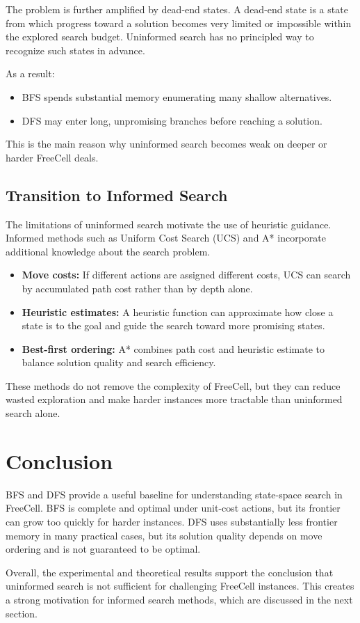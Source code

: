\documentclass{article}
\begin{document}
The problem is further amplified by dead-end states. A dead-end state is a state from which progress toward a solution becomes very limited or impossible within the explored search budget. Uninformed search has no principled way to recognize such states in advance.

As a result:
\begin{itemize}
\item BFS spends substantial memory enumerating many shallow alternatives.
\item DFS may enter long, unpromising branches before reaching a solution.
\end{itemize}

This is the main reason why uninformed search becomes weak on deeper or harder FreeCell deals.

\subsection{Transition to Informed Search}

The limitations of uninformed search motivate the use of heuristic guidance. Informed methods such as Uniform Cost Search (UCS) and A* incorporate additional knowledge about the search problem.

\begin{itemize}
\item \textbf{Move costs:} If different actions are assigned different costs, UCS can search by accumulated path cost rather than by depth alone.
\item \textbf{Heuristic estimates:} A heuristic function can approximate how close a state is to the goal and guide the search toward more promising states.
\item \textbf{Best-first ordering:} A* combines path cost and heuristic estimate to balance solution quality and search efficiency.
\end{itemize}

These methods do not remove the complexity of FreeCell, but they can reduce wasted exploration and make harder instances more tractable than uninformed search alone.

\section{Conclusion}

BFS and DFS provide a useful baseline for understanding state-space search in FreeCell. BFS is complete and optimal under unit-cost actions, but its frontier can grow too quickly for harder instances. DFS uses substantially less frontier memory in many practical cases, but its solution quality depends on move ordering and is not guaranteed to be optimal.

Overall, the experimental and theoretical results support the conclusion that uninformed search is not sufficient for challenging FreeCell instances. This creates a strong motivation for informed search methods, which are discussed in the next section.
\end{document}
